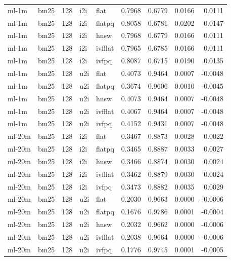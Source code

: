 \begin{tabular}{llrllrrrr}
ml-1m & bm25 & 128 & i2i & flat & 0.7968 & 0.6779 & 0.0166 & 0.0111 \\
ml-1m & bm25 & 128 & i2i & flatpq & 0.8058 & 0.6781 & 0.0202 & 0.0147 \\
ml-1m & bm25 & 128 & i2i & hnsw & 0.7968 & 0.6779 & 0.0166 & 0.0111 \\
ml-1m & bm25 & 128 & i2i & ivfflat & 0.7965 & 0.6785 & 0.0166 & 0.0111 \\
ml-1m & bm25 & 128 & i2i & ivfpq & 0.8087 & 0.6715 & 0.0190 & 0.0135 \\
ml-1m & bm25 & 128 & u2i & flat & 0.4073 & 0.9464 & 0.0007 & -0.0048 \\
ml-1m & bm25 & 128 & u2i & flatpq & 0.3674 & 0.9606 & 0.0010 & -0.0045 \\
ml-1m & bm25 & 128 & u2i & hnsw & 0.4073 & 0.9464 & 0.0007 & -0.0048 \\
ml-1m & bm25 & 128 & u2i & ivfflat & 0.4067 & 0.9464 & 0.0007 & -0.0048 \\
ml-1m & bm25 & 128 & u2i & ivfpq & 0.4152 & 0.9431 & 0.0007 & -0.0048 \\
ml-20m & bm25 & 128 & i2i & flat & 0.3467 & 0.8873 & 0.0028 & 0.0022 \\
ml-20m & bm25 & 128 & i2i & flatpq & 0.3465 & 0.8887 & 0.0033 & 0.0027 \\
ml-20m & bm25 & 128 & i2i & hnsw & 0.3466 & 0.8874 & 0.0030 & 0.0024 \\
ml-20m & bm25 & 128 & i2i & ivfflat & 0.3462 & 0.8879 & 0.0030 & 0.0024 \\
ml-20m & bm25 & 128 & i2i & ivfpq & 0.3473 & 0.8882 & 0.0035 & 0.0029 \\
ml-20m & bm25 & 128 & u2i & flat & 0.2030 & 0.9663 & 0.0000 & -0.0006 \\
ml-20m & bm25 & 128 & u2i & flatpq & 0.1676 & 0.9786 & 0.0001 & -0.0004 \\
ml-20m & bm25 & 128 & u2i & hnsw & 0.2032 & 0.9662 & 0.0000 & -0.0006 \\
ml-20m & bm25 & 128 & u2i & ivfflat & 0.2038 & 0.9664 & 0.0000 & -0.0006 \\
ml-20m & bm25 & 128 & u2i & ivfpq & 0.1776 & 0.9745 & 0.0001 & -0.0005 \\
\bottomrule
\end{tabular}
